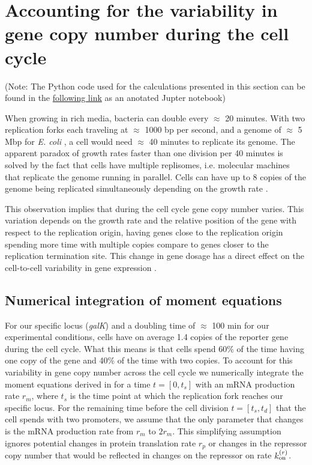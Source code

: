 \section{Accounting for the variability in gene copy number during the cell
cycle} \label{supp_multi_gene}

(Note: The Python code used for the calculations presented in this section can
be found in the
\href{https://www.rpgroup.caltech.edu/chann_cap/src/theory/html/moment_dynamics_cell_division.html}{following
link} as an anotated Jupter notebook)

When growing in rich media, bacteria can double every $\approx$ 20 minutes.
With two replication forks each traveling at $\approx$ 1000 bp per second, and
a genome of $\approx$ 5 Mbp for {\it E. coli} \cite{Moran2010}, a cell would
need $\approx$ 40 minutes to replicate its genome. The apparent paradox  of
growth rates faster than one division per 40 minutes is solved by the fact that
cells have multiple replisomes, i.e. molecular machines that replicate the
genome running in parallel. Cells can have up to 8 copies of the genome being
replicated simultaneously depending on the growth rate \cite{Bremer1996}.

This observation implies that during the cell cycle gene copy number varies.
This variation depends on the growth rate and the relative position of the gene
with respect to the replication origin, having genes close to the replication
origin spending more time with multiple copies compare to genes closer to the
replication termination site. This change in gene dosage has a direct effect on
the cell-to-cell variability in gene expression \cite{Jones2014a,
Peterson2015}.

\subsection{Numerical integration of moment equations}

For our specific locus ({\it galK}) and a doubling time of $\approx$ 100 min
for our experimental conditions, cells have on average 1.4 copies of the
reporter gene during the cell cycle. What this means is that cells spend 60\%
of the time having one copy of the gene and 40\% of the time with two copies.
To account for this variability in gene copy number across the cell cycle we
numerically integrate the moment equations derived in  for
a time $t = [0, t_s]$ with an mRNA production rate $r_m$, where $t_s$ is the
time point at which the replication fork reaches our specific locus. For the
remaining time before the cell division $t = [t_s, t_d]$ that the cell spends
with two promoters, we assume that the only parameter that changes is the mRNA
production rate from $r_m$ to $2 r_m$. This simplifying assumption ignores
potential changes in protein translation rate $r_p$ or changes in the repressor
copy number that would be reflected in changes on the repressor on rate
$k^{(r)}_{\text{on}}$.

